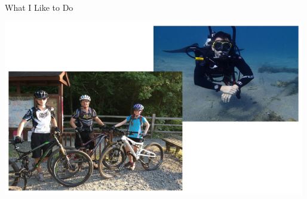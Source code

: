 \documentclass{beamer}
\begin{document}
\begin{frame}[fragile]{What I Like to Do}

\begin{center}
\includegraphics[height=3in]{chris-hobbies.png}
\end{center}


\end{frame}






\end{document}
